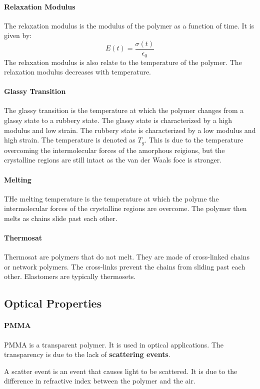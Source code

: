 \documentclass[11pt]{report}
\begin{document}
\paragraph{Relaxation Modulus} The relaxation modulus is the modulus of the polymer as a function of time. It is given by:
\begin{equation}
    E(t) = \frac{\sigma(t)}{\epsilon_0}
\end{equation}
The relaxation modulus is also relate to the temperature of the polymer. The relaxation modulus decreases with temperature.
\paragraph{Glassy Transition} The glassy transition is the temperature at which the polymer changes from a glassy state to a rubbery state. The glassy state is characterized by a high modulus and low strain. The rubbery state is characterized by a low modulus and high strain. The temperature is denoted as $T_g$.
This is due to the temperature overcoming the intermolecular forces of the amorphous reigions, but the crystalline regions are still intact as the van der Waals foce is stronger.
\paragraph{Melting} THe melting temperature is the temperature at which the polyme the intermolecular forces of the crystalline regions are overcome. The polymer then melts as chains slide past each other. 
\paragraph{Thermosat} Thermosat are polymers that do not melt. They are made of cross-linked chains or network polymers. The cross-links prevent the chains from sliding past each other. Elastomers are typically thermosets.
\subsection{Optical Properties}
\paragraph{PMMA} PMMA is a transparent polymer. It is used in optical applications. The transparency is due to the lack of \textbf{scattering events}.
\begin{definition}
    A scatter event is an event that causes light to be scattered. It is due to the difference in refractive index between the polymer and the air.
\end{definition}

\end{document}
